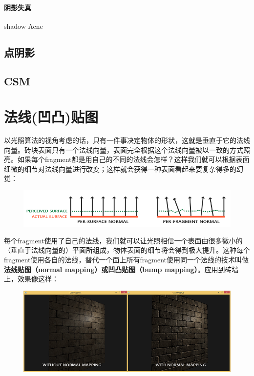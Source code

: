 \documentclass[UTF8,a4paper,12pt]{ctexbook}
\begin{document}
			\paragraph{阴影失真}
				shadow  Acne
				
		\subsection{点阴影}
		
		\subsection{CSM}
		
	
	\section{法线(凹凸)贴图}
		以光照算法的视角考虑的话，只有一件事决定物体的形状，这就是垂直于它的法线向量。砖块表面只有一个法线向量，表面完全根据这个法线向量被以一致的方式照亮。如果每个fragment都是用自己的不同的法线会怎样？这样我们就可以根据表面细微的细节对法线向量进行改变；这样就会获得一种表面看起来要复杂得多的幻觉：
		
		\begin{figure}[H]
			\centering
			\includegraphics[width=\linewidth]{normal_mapping_surfaces}
		\end{figure}
	
		每个fragment使用了自己的法线，我们就可以让光照相信一个表面由很多微小的（垂直于法线向量的）平面所组成，物体表面的细节将会得到极大提升。这种每个fragment使用各自的法线，替代一个面上所有fragment使用同一个法线的技术叫做\textbf{法线贴图（normal mapping）或凹凸贴图（bump mapping）}。应用到砖墙上，效果像这样：		
		
		\begin{figure}[H]
			\centering
			\includegraphics[width=\linewidth]{normal_mapping_compare}
		\end{figure}
		
\end{document}
